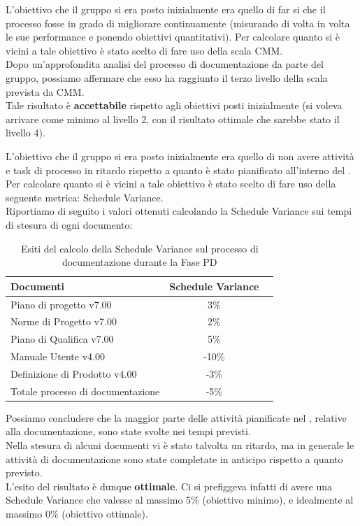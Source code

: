 				L'obiettivo che il gruppo si era posto inizialmente era quello di far si che il processo fosse in grado di migliorare continuamente (misurando di volta in volta le sue performance e ponendo obiettivi quantitativi). Per calcolare quanto si è vicini a tale obiettivo è stato scelto di fare uso della scala CMM.\\
				Dopo un'approfondita analisi del processo di documentazione da parte del gruppo, possiamo affermare che esso ha raggiunto il terzo livello della scala prevista da CMM.\\
				Tale risultato è \textbf{accettabile} rispetto agli obiettivi posti inizialmente (si voleva arrivare come minimo al livello 2, con il risultato ottimale che sarebbe stato il livello 4).
			
				L'obiettivo che il gruppo si era posto inizialmente era quello di non avere attività e task di processo in ritardo rispetto a quanto è stato pianificato all'interno del . Per calcolare quanto si è vicini a tale obiettivo è stato scelto di fare uso della seguente metrica: Schedule Variance.\\
				Riportiamo di seguito i valori ottenuti calcolando la Schedule Variance sui tempi di stesura di ogni documento:			
				\begin{table}[H]
					\centering
					\begin{tabu}{| l | c | c |}
						\hline
						Documenti 							& Schedule Variance   \\ \hline \hline
						Piano di progetto v7.00				& 3\%                 \\ \hline
						Norme di Progetto v7.00 			& 2\%                 \\ \hline
						Piano di Qualifica v7.00 			& 5\%                 \\ \hline
						Manuale Utente v4.00 				& -10\%               \\ \hline
						Definizione di Prodotto v4.00 		& -3\%                \\ \hline
						Totale processo di documentazione 	& -5\%                \\ \hline
					\end{tabu}
					\caption{Esiti del calcolo della Schedule Variance sul processo di documentazione durante la Fase PD}
				\end{table}
				Possiamo concludere che la maggior parte delle attività pianificate nel , relative alla documentazione, sono state svolte nei tempi previsti.\\ Nella stesura di alcuni documenti vi è stato talvolta un ritardo, ma in generale le attività di documentazione sono state completate in anticipo rispetto a quanto previsto.\\
				L'esito del risultato è dunque \textbf{ottimale}. Ci si prefiggeva infatti di avere una Schedule Variance che valesse al massimo 5\% (obiettivo minimo), e idealmente al massimo 0\% (obiettivo ottimale).


